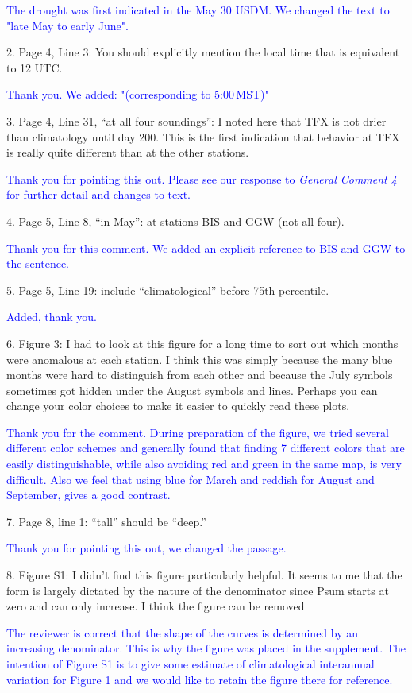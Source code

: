 \documentclass[hess, manuscript]{copernicus}
\def\TG{\textcolor{blue}}
\begin{document}
\TG{The drought was first indicated in the May 30 USDM. We changed the text to "late May to early June".}

2.  Page 4, Line 3: You should explicitly mention the local time that is equivalent to 12 UTC.

\TG{Thank you. We added: "(corresponding to 5:00\,MST)"}

3.   Page 4,  Line 31,  “at all four soundings”:  I noted here that TFX is not drier than climatology until day 200. This is the first indication that behavior at TFX is really quite different than at the other stations. 

\TG{Thank you for pointing this out. Please see our response to \emph{General Comment 4} for further detail and changes to text.}

4. Page 5, Line 8, “in May”: at stations BIS and GGW (not all four).

\TG{Thank you for this comment. We added an explicit reference to BIS and GGW to the sentence.}

5. Page 5, Line 19: include “climatological” before 75th percentile.

\TG{Added, thank you.}

6.  Figure 3:  I had to look at this figure for a long time to sort out which months were anomalous at each station.   I think this was simply because the many blue months were hard to distinguish from each other and because the July symbols sometimes got hidden under the August symbols and lines.  Perhaps you can change your color choices to make it easier to quickly read these plots. 

\TG{Thank you for the comment. During preparation of the figure, we tried several different color schemes and generally found that finding 7 different colors that are easily distinguishable, while also avoiding red and green in the same map, is very difficult. Also we feel that using blue for March and reddish for August and September, gives a good contrast.}

7. Page 8, line 1: “tall” should be “deep.” 

\TG{Thank you for pointing this out, we changed the passage.}

8.  Figure S1:  I didn’t find this figure particularly helpful.  It seems to me that the form is largely dictated by the nature of the denominator since Psum starts at zero and can only increase. I think the figure can be removed

\TG{The reviewer is correct that the shape of the curves is determined by an increasing denominator. This is why the figure was placed in the supplement. The intention of Figure S1 is to give some estimate of climatological interannual variation for Figure 1 and we would like to retain the figure there for reference.}
\end{document}
